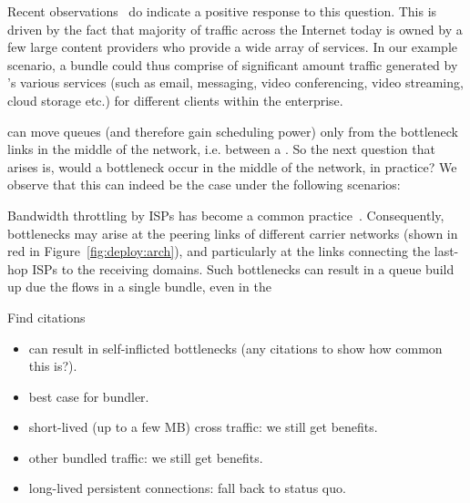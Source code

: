 Recent observations~\cite{fivecomps}  do indicate a positive response to this question. This is driven by the fact that majority of traffic across the Internet today is owned by a few large content providers who provide a wide array of services. In our example scenario, a bundle could thus comprise of significant amount traffic generated by \egsender's various services (such as email, messaging, video conferencing, video streaming, cloud storage etc.) for different clients within the enterprise.




 \name can move queues (and therefore gain scheduling power) only from the bottleneck links in the middle of the network, i.e. between a \pair. So the next question that arises is, would a bottleneck occur in the middle of the network, in practice? We observe that this can indeed be the case under the following scenarios:

 Bandwidth throttling by ISPs has become a common practice~\cite{isp-throttle-1, isp-throttle-2, isp-throttle-3}. Consequently, bottlenecks may arise at the peering links of different carrier networks (shown in red in Figure~\ref{fig:deploy:arch}), and particularly at the links connecting the last-hop ISPs to the receiving domains. Such bottlenecks can result in a queue build up due the flows in a single bundle, even in the 

Find citations
\begin{itemize}
    \item can result in self-inflicted bottlenecks (any citations to show how common this is?).
    \item best case for bundler.
\end{itemize}

\begin{itemize}
    \item short-lived (up to a few MB) cross traffic: we still get benefits.
    \item other bundled traffic: we still get benefits.
    \item long-lived persistent connections: fall back to status quo.
\end{itemize}

